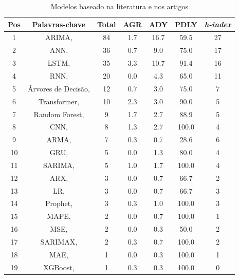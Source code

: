 \begin{table}[H]
	\centering
	\caption{Modelos baseado na literatura e nos artigos}\label{tb:mode}
	\begin{tabular}{ccccccc}
		\toprule
		Pos & Palavras-chave & Total & AGR & ADY & PDLY & \textit{h-index} \\
		\midrule
		1 & ARIMA, \citeonline{2-s2.0-85069459067} & 84 & 1.7 & 16.7 & 59.5 & 27 \\
		2 & ANN, \citeonline{2-s2.0-85054695177} & 36 & 0.7 & 9.0 & 75.0 & 17 \\
		3 & LSTM, \citeonline{WOS:000529902300014} & 35 & 3.3 & 10.7 & 91.4 & 16 \\
		4 & RNN, \citeonline{2-s2.0-85067419084} & 20 & 0.0 & 4.3 & 65.0 & 11 \\
		5 & Árvores de Decisão, \citeonline{2-s2.0-85054695177} & 12 & 0.7 & 3.0 & 75.0 & 7 \\
		6 & Transformer, \citeonline{2-s2.0-85045193200} & 10 & 2.3 & 3.0 & 90.0 & 5 \\
		7 & Random Forest, \citeonline{2-s2.0-85135210428} & 9 & 1.7 & 2.7 & 88.9 & 5 \\
		8 & CNN, \citeonline{WOS:000841076700002} & 8 & 1.3 & 2.7 & 100.0 & 4 \\
		9 & ARMA, \citeonline{2-s2.0-85038637324} & 7 & 0.3 & 0.7 & 28.6 & 6 \\
		10 & GRU, \citeonline{2-s2.0-85135210428} & 5 & 0.0 & 1.3 & 80.0 & 4 \\
		11 & SARIMA, \citeonline{2-s2.0-85128561644} & 5 & 1.0 & 1.7 & 100.0 & 4 \\
		12 & ARX, \citeonline{2-s2.0-85051469381} & 3 & 0.0 & 0.7 & 66.7 & 2 \\
		13 & LR, \citeonline{2-s2.0-85125426780} & 3 & 0.0 & 0.7 & 66.7 & 3 \\
		14 & Prophet, \citeonline{2-s2.0-85092514286} & 3 & 0.3 & 1.0 & 100.0 & 3 \\
		15 & MAPE, \citeonline{2-s2.0-85097173237} & 2 & 0.0 & 0.7 & 100.0 & 1 \\
		16 & MSE, \citeonline{2-s2.0-85096470870} & 2 & 0.0 & 0.3 & 50.0 & 2 \\
		17 & SARIMAX,\citeonline{2-s2.0-85099424908} & 2 & 0.3 & 0.7 & 100.0 & 2 \\
		18 & MAE, \citeonline{2-s2.0-85082955699} & 1 & 0.0 & 0.3 & 100.0 & 1 \\
		19 & XGBoost, \citeonline{2-s2.0-85130441623} & 1 & 0.3 & 0.3 & 100.0 & 0 \\
		\bottomrule
	\end{tabular}
	
	
	
\end{table}


